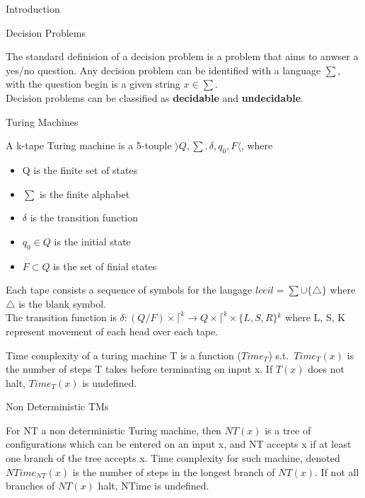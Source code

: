 \documentclass[12pt, letterpaper]{article}
\begin{document}
\begin{section}{Introduction}

  \begin{subsection}{Decision Problems}

    The standard definision of a decision problem is a problem that aims to
    anwser a yes/no question. Any decision problem can be identified with a
    language \(\sum\), with the question begin is a given string \(x \in
    \sum\). \\
    Decision problems can be classified as \textbf{decidable} and
    \textbf{undecidable}.

  \end{subsection}

  \begin{subsection}{Turing Machines}

    A k-tape Turing machine is a 5-touple \(\rangle Q, \sum, \delta, q_{0}, F
    \langle\), where
    \begin{itemize}
      \item Q is the finite set of states
      \item \(\sum\) is the finite alphabet
      \item \(\delta\) is the transition function
      \item \(q_{0} \in Q\) is the initial state
      \item \(F \subset Q\) is the set of finial states
    \end{itemize}

    Each tape consists a sequence of symbols for the langage \(lceil = \sum
    \cup \{ \triangle \}\) where \(\triangle\) is the blank symbol. \\
    The transition function is \(\delta : (Q / F) \times \lceil^{k} \to
    Q \times \lceil^{k} \times \{ L, S, R \}{}^{k}\) where L, S, K represent
    movement of each head over each tape.

    Time complexity of a turing machine T is a function (\(Time_{T}\)) s.t.\
    \(Time_{T}(x)\) is the number of steps T takes before terminating on input
    x. If \(T(x)\) does not halt, \(Time_{T}(x)\) is undefined.

    \begin{subsubsection}{Non Deterministic TMs}

      For NT a non deterministic Turing machine, then \(NT(x)\) is a tree of
      configurations which can be entered on an input x, and NT accepts x if at
      least one branch of the tree accepts x. Time complexity for such machine,
      denoted \(NTime_{NT}(x)\) is the number of steps in the longest branch of
      \(NT(x)\). If not all branches of \(NT(x)\) halt, NTime is undefined.

    \end{subsubsection}

  \end{subsection}

\end{section}
\end{document}
